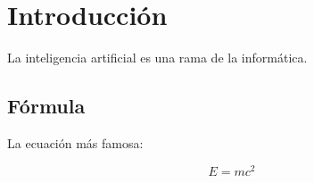 \section{Introducción}

La inteligencia artificial es una rama de la informática.

\subsection{Fórmula}

La ecuación más famosa:

\[
E = mc^2
\]